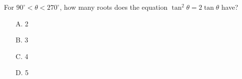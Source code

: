
For $90^{\circ}<\theta<270^{\circ}$, how many roots does the equation $\tan^{2}\theta=2\tan\theta$ have?
    \begin{itemize}
        \item[A.] 2
        \item[B.] 3
        \item[C.] 4
        \item[D.] 5
    \end{itemize}




